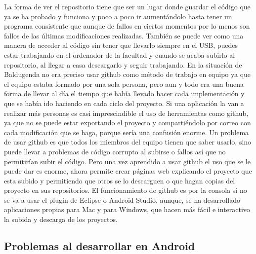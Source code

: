 La forma de ver el repositorio tiene que ser un lugar donde guardar el código que ya se ha probado y funciona y poco a poco ir aumentándolo hasta tener un programa consistente que aunque de fallos en ciertos momentos por lo menos son fallos de las últimas modificaciones realizadas.
También se puede ver como una manera de acceder al código sin tener que llevarlo siempre en el USB, puedes estar trabajando en el ordenador de la facultad y cuando se acaba subirlo al repositorio, al llegar a casa descargarlo y seguir trabajando. 
En la situación de Baldugenda no era preciso usar github como método de trabajo en equipo ya que el equipo estaba formado por una sola persona, pero aun y todo era una buena forma de llevar al día el tiempo que había llevado hacer cada implementación y que se había ido haciendo en cada ciclo del proyecto.
Si una aplicación la van a realizar más personas es casi imprescindible el uso de herramientas como github, ya que no se puede estar exportando el proyecto y compartiéndolo por correo con cada modificación que se haga, porque sería una confusión enorme.
Un problema de usar github es que todos los miembros del equipo tienen que saber usarlo, sino puede llevar a problemas de código corrupto al subirse o fallos así que no permitirían subir el código. Pero una vez aprendido a usar github el uso que se le puede dar es enorme, ahora permite crear páginas web explicando el proyecto que esta subido y permitiendo que otros se lo descarguen o que hagan copias del proyecto en sus repositorios.
El funcionamiento de github es por la consola si no se va a usar el plugin de Eclipse o Android Studio, aunque, se ha desarrollado aplicaciones propias para Mac  y para Windows, que hacen más fácil e interactivo la subida y descarga de los proyectos.

\subsection{Problemas al desarrollar en Android}
\label{subsecc:Problemas al desarrollar en Android}

